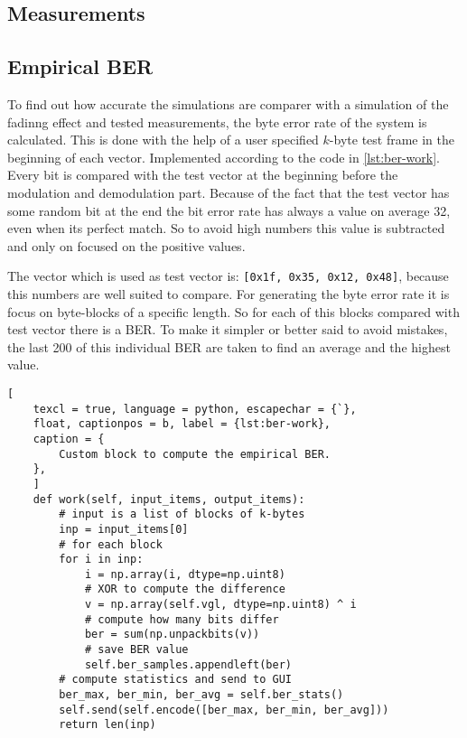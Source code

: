 % 	


\subsection{Measurements}


\subsection{Empirical BER} \label{sec:ber}
To find out how accurate the simulations are comparer with a simulation of the fadinng effect and tested measurements, the byte error rate of the system is calculated. This is done with the help of a user specified \(k\)-byte test frame in the beginning of each vector. Implemented according to the code in \ref{lst:ber-work}. Every bit is compared with the test vector at the beginning before the modulation and demodulation part. 
Because of the fact that the test vector has some random bit at the end the bit error rate has always a value on average 32, even when its perfect match.  So to avoid high numbers this value is subtracted and only on focused on the positive values. 

The vector which is used as test vector is: \texttt{[0x1f, 0x35, 0x12, 0x48]}, because this numbers are well suited to compare.
For generating the byte error rate it is focus on byte-blocks of a specific length. So for each of this blocks compared with test vector there is a BER. To make it simpler or better said to avoid mistakes, the last 200 of this individual BER are taken to find an average and the highest value. 



\begin{lstlisting}[
	texcl = true, language = python, escapechar = {`},
	float, captionpos = b, label = {lst:ber-work},
	caption = {
		Custom block to compute the empirical BER.
	},
	]
	def work(self, input_items, output_items):
		# input is a list of blocks of k-bytes
		inp = input_items[0]
		# for each block
		for i in inp:
			i = np.array(i, dtype=np.uint8)
			# XOR to compute the difference
			v = np.array(self.vgl, dtype=np.uint8) ^ i
			# compute how many bits differ
			ber = sum(np.unpackbits(v))
			# save BER value
			self.ber_samples.appendleft(ber)
		# compute statistics and send to GUI
		ber_max, ber_min, ber_avg = self.ber_stats()
		self.send(self.encode([ber_max, ber_min, ber_avg]))
		return len(inp)
\end{lstlisting}

